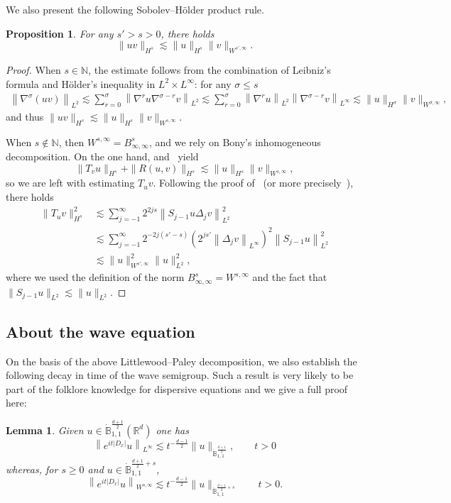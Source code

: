 \documentclass[10pt]{amsart}
\newtheorem{lemm}[theo]{Lemma}\newtheorem{prop}[theo]{Proposition}\newtheorem{coro}[theo]{Corollary}\newtheorem{conj}[theo]{Conjecture}
\theoremstyle{definition}\newtheorem{defi}[theo]{Definition}\newtheorem{rema}[theo]{Remark}\newtheorem{exam}[theo]{Example}\newtheorem{exem}[theo]{Example}\newtheorem{nota}[theo]{Notation}
\newcommand{\R}{\mathbb{R}}
\newcommand{\N}{\mathbb{N}}
\newcommand{\bbB}{\mathbb{B}}
\renewcommand*\le{\leqslant}
\renewcommand*\geq{\geqslant}
\begin{document}
We also present the following Sobolev--H\"older product rule.
\begin{prop}\label{prop:product_sobolev_holder}
For any $s' > s > 0$, there holds
\[
\| u v \|_{H^s} \lesssim \| u \|_{H^s} \| v \|_{W^{s', \infty}}.
\]
\end{prop}
\begin{proof}
When $s \in \N$, the estimate follows from the combination of Leibniz's formula and H\"older's inequality in $L^2 \times L^\infty$: for any $\sigma \le s$
\begin{align*}
\left\| \nabla^\sigma (u v) \right\|_{L^2} \lesssim \sum_{r = 0}^\sigma \left\| \nabla^r u \nabla^{\sigma - r} v \right\|_{L^2}
\lesssim \sum_{r = 0}^\sigma \left\| \nabla^r u \right\|_{L^2} \left\| \nabla^{\sigma - r} v \right\|_{L^\infty} \lesssim \| u \|_{H^\sigma} \| v \|_{W^{\sigma, \infty}},
\end{align*}
and thus $\| uv \|_{H^s} \lesssim \| u \|_{H^s} \| v \|_{W^{s, \infty}}$.

When $s \notin \N$, then $W^{s, \infty} = B^{s}_{\infty, \infty}$, and we rely on Bony's inhomogeneous decomposition. On the one hand, \cite[Theorem~2.82]{BCD2011} and~\cite[Theorem~2.85]{BCD2011} yield
\[
\| T_v u \|_{H^s} + \| R(u, v) \|_{H^s} \lesssim \| u \|_{H^s} \| v \|_{W^{s, \infty}},
\]
so we are left with estimating $T_u v$. Following the proof of~\cite[Theorem~2.82]{BCD2011} (or more precisely~\cite[Theorem~2.82]{BCD2011}), there holds
\begin{equation*}
\begin{split}
\| T_u v \|_{H^s}^2 & \lesssim \sum_{j = -1}^\infty 2^{2 j s} \left\| S_{j-1} u \Delta_j v \right\|_{L^2}^2 \\
& \lesssim \sum_{j = -1}^\infty 2^{-2 j (s'-s)} \left(2^{ j s'} \left\| \Delta_j v \right\|_{L^\infty} \right)^2 \left\| S_{j-1} u \right\|_{L^2}^2 \\
& \lesssim \| u \|_{W^{s', \infty}}^2 \| u \|_{L^2}^2,
\end{split}
\end{equation*}
where we used the definition of the norm $B^{s}_{\infty, \infty}=W^{s, \infty}$ and the fact that $\| S_{j-1} u \|_{L^2} \lesssim \| u \|_{L^2}$.
\end{proof}

\subsection{About the wave equation} 

On the basis of the above Littlewood--Paley decomposition, we also establish the following decay in time of the wave semigroup. Such a result is very likely to be part of the folklore knowledge for dispersive equations and we give a full proof here:
\begin{lemm}\label{lem:wave-equation}
Given $u \in \dot{\bbB}_{1,1}^{\frac{d+1}{2}}(\R^d)$ one has
\[
\left\|e^{it|D_x|}u\right\|_{L^\infty} \lesssim t^{-\frac{d-1}{2}}\|u\|_{\dot{\bbB}_{1,1}^{\frac{d+1}{2}}}, \qquad t >0
\]
whereas, for $s \geq 0$ and $u \in \dot{\bbB}_{1,1}^{\frac{d+1}{2}+s}$,
\[
\left\|e^{it|D_x|}u\right\|_{W^{s,\infty}}\lesssim t^{-\frac{d-1}{2}}\|u\|_{\dot{\bbB}^{\frac{d+1}{2}+s}_{1,1}} \qquad t >0.
\]
\end{lemm}
\end{document}
